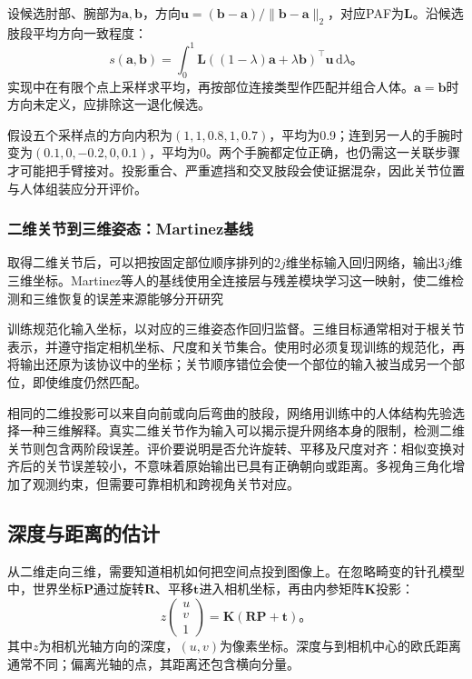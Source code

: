 设候选肘部、腕部为$\bm{a},\bm{b}$，方向$\bm{u}=(\bm{b}-\bm{a})/\lVert\bm{b}-\bm{a}\rVert_2$，对应PAF为$\bm{L}$。沿候选肢段平均方向一致程度：
\begin{equation}
 s(\bm{a},\bm{b})=
 \int_0^1
 \bm{L}((1-\lambda)\bm{a}+\lambda\bm{b})^\top
 \bm{u}\,\mathrm{d}\lambda\text{。}
 \label{eq:vision-paf-score}
\end{equation}
实现中在有限个点上采样求平均，再按部位连接类型作匹配并组合人体。$\bm{a}=\bm{b}$时方向未定义，应排除这一退化候选。

假设五个采样点的方向内积为$(1,1,0.8,1,0.7)$，平均为0.9；连到另一人的手腕时变为$(0.1,0,-0.2,0,0.1)$，平均为0。两个手腕都定位正确，也仍需这一关联步骤才可能把手臂接对。投影重合、严重遮挡和交叉肢段会使证据混杂，因此关节位置与人体组装应分开评价。

\subsubsection{二维关节到三维姿态：Martinez基线}
\label{sec:vision-recognition-lifting}

取得二维关节后，可以把按固定部位顺序排列的$2j$维坐标输入回归网络，输出$3j$维三维坐标。Martinez等人的基线使用全连接层与残差模块学习这一映射，使二维检测和三维恢复的误差来源能够分开研究

训练规范化输入坐标，以对应的三维姿态作回归监督。三维目标通常相对于根关节表示，并遵守指定相机坐标、尺度和关节集合。使用时必须复现训练的规范化，再将输出还原为该协议中的坐标；关节顺序错位会使一个部位的输入被当成另一个部位，即使维度仍然匹配。

相同的二维投影可以来自向前或向后弯曲的肢段，网络用训练中的人体结构先验选择一种三维解释。真实二维关节作为输入可以揭示提升网络本身的限制，检测二维关节则包含两阶段误差。评价要说明是否允许旋转、平移及尺度对齐：相似变换对齐后的关节误差较小，不意味着原始输出已具有正确朝向或距离。多视角三角化增加了观测约束，但需要可靠相机和跨视角关节对应。

\subsection{深度与距离的估计}
\label{sec:vision-recognition-depth}

从二维走向三维，需要知道相机如何把空间点投到图像上。在忽略畸变的针孔模型中，世界坐标$\bm{P}$通过旋转$\bm{R}$、平移$\bm{t}$进入相机坐标，再由内参矩阵$\bm{K}$投影：
\begin{equation}
 z\begin{pmatrix}u\\v\\1\end{pmatrix}
 =\bm{K}(\bm{R}\bm{P}+\bm{t})\text{。}
 \label{eq:vision-camera-projection}
\end{equation}
其中$z$为相机光轴方向的深度，$(u,v)$为像素坐标。深度与到相机中心的欧氏距离通常不同；偏离光轴的点，其距离还包含横向分量。

